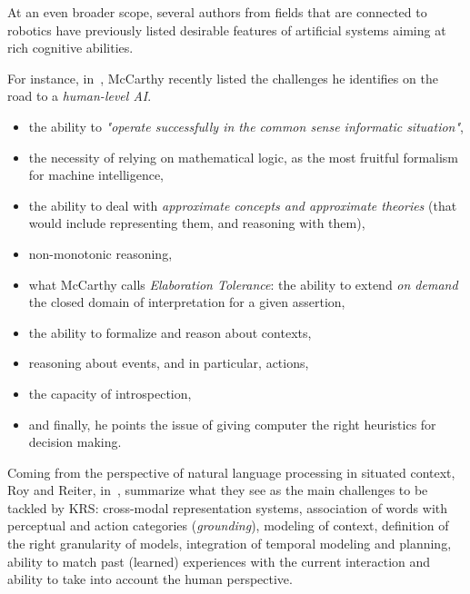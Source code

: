 \documentclass[a4paper, twocolumn]{article}
\begin{document}
At an even broader scope, several authors from fields that are connected to robotics
have previously listed desirable features of artificial systems aiming at
rich cognitive abilities.

For instance, in~\cite{McCarthy2007}, McCarthy recently listed the challenges
he identifies on the road to a \emph{human-level AI}.

\begin{itemize}

	\item the ability to \emph{"operate successfully in the common sense
	informatic situation"},

	\item the necessity of relying on mathematical logic, as the most fruitful
	formalism for machine intelligence,

	\item the ability to deal with \emph{approximate concepts and approximate
	theories} (that would include representing them, and reasoning with them),

	\item non-monotonic reasoning,

	\item what McCarthy calls \emph{Elaboration Tolerance}: the ability to
	extend \emph{on demand} the closed domain of interpretation for a
	given assertion,

	\item the ability to formalize and reason about contexts,

	\item reasoning about events, and in particular, actions,

	\item the capacity of introspection,

	\item and finally, he points the issue of giving computer the right
	heuristics for decision making.

\end{itemize}

Coming from the perspective of natural language processing in situated context,
Roy and Reiter, in~\cite{Roy2005}, summarize what they see as the main
challenges to be tackled by KRS: cross-modal representation systems,
association of words with perceptual and action categories (\emph{grounding}),
modeling of context, definition of the right granularity of models, integration
of temporal modeling and planning, ability to match past (learned) experiences
with the current interaction and ability to take into account the human
perspective.
\end{document}
